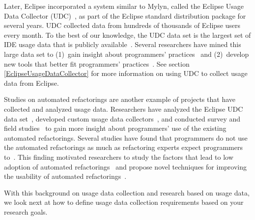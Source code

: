 %
Later, Eclipse incorporated a system similar to Mylyn, called the Eclipse Usage
Data Collector (UDC)~\cite{WebPageUDC}, as part of the Eclipse standard
distribution package for several years. UDC collected data from hundreds of
thousands of Eclipse users every month. To the best of our knowledge, the UDC
data set is the largest set of IDE usage data that is publicly
available~\cite{WebPageUDCArchive}. Several researchers have mined this large
data set to
%
(1)~gain insight about programmers'
practices~\cite{VakilianJohnson2014Alternate, VakilianETAL2013Compositional,
V:MurphyHill2012How} and
%
(2)~develop new tools that better fit programmers'
practices~\cite{MurphyHill2012Improving, VakilianETAL2013Compositional}.
See section \ref {EclipseUsageDataCollector} for more information on using UDC to collect usage data from Eclipse.

Studies on automated refactorings are another example of projects that have
collected and analyzed usage data. Researchers have analyzed the Eclipse UDC
data set~\cite{V:MurphyHill2012How, VakilianETAL2013Compositional}, developed
custom usage data collectors~\cite{VakilianETAL2012UseDisuseMisuse}, and
conducted survey and field studies~\cite{V:MurphyHill2012How,
VakilianJohnson2014Alternate, NegaraETAL2013ManualRefactorings} to gain more
insight about programmers' use of the existing automated refactorings. Several
studies have found that programmers do not use the automated refactorings as
much as refactoring experts expect programmers to~\cite{V:MurphyHill2012How,
NegaraETAL2013ManualRefactorings}. This finding motivated researchers to study
the factors that lead to low adoption of automated
refactorings~\cite{VakilianETAL2012UseDisuseMisuse, V:MurphyHill2012How} and
propose novel techniques for improving the usability of automated
refactorings~\cite{V:MurphyHill2012How, MurphyHill2012Improving,
MurphyHill2008ExtractMethod, LeeETAL2013DragDrop, MurphyHillETAL2011Gestures,
GeETAL2012BeneFactor, FosterETAL2012WitchDoctor}.

\vspace{0.1in}

With this background on usage data collection and research based on usage data, we look next at how to define usage data collection requirements based on your research goals.


